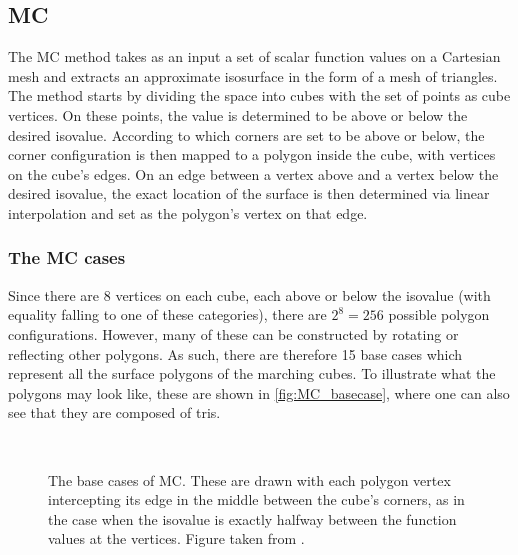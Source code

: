 \subsection{\Acl{MC}} 
The \acf{MC} method \cite{Marching2006} takes as an input a set of scalar function values on a Cartesian mesh and extracts an approximate isosurface in the form of a mesh of triangles. The method starts by dividing the space into cubes with the set of points as cube vertices. On these points, the value is determined to be above or below the desired isovalue. According to which corners are set to be above or below, the corner configuration is then mapped to a polygon inside the cube, with vertices on the cube's edges. On an edge between a vertex above and a vertex below the desired isovalue, the exact location of the surface is then determined via linear interpolation and set as the polygon's vertex on that edge.

\subsubsection{The \acl{MC} cases}
Since there are 8 vertices on each cube, each above or below the isovalue (with equality falling to one of these categories), there are $2^8=256$ possible polygon configurations. However, many of these can be constructed by rotating or reflecting other polygons. As such, there are therefore 15 base cases which represent all the surface polygons of the marching cubes. To illustrate what the polygons may look like, these are shown in \autoref{fig:MC_basecase}, where one can also see that they are composed of \acp{tri}. 

\begin{figure}[b]
\centering
   \\
   \caption{The base cases of \ac{MC}. These are drawn with each polygon vertex intercepting its edge in the middle between the cube's corners, as in the case when the isovalue is exactly halfway between the function values at the vertices. Figure taken from \cite{Marching2006}.}
   \label{fig:MC_basecase}
\end{figure}

